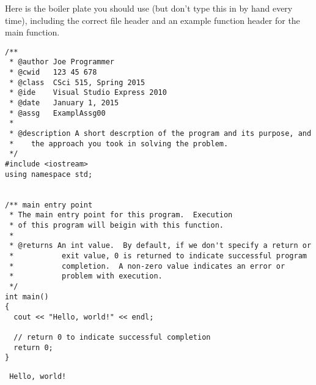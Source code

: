 \documentclass[11pt]{article}
\begin{document}
Here is the boiler plate you should use (but don't type this in by hand every time), including the correct file
header and an example function header for the main function.


\begin{verbatim}
/**
 * @author Joe Programmer
 * @cwid   123 45 678
 * @class  CSci 515, Spring 2015
 * @ide    Visual Studio Express 2010
 * @date   January 1, 2015
 * @assg   ExamplAssg00
 *
 * @description A short descrption of the program and its purpose, and
 *    the approach you took in solving the problem.
 */
#include <iostream>
using namespace std;


/** main entry point
 * The main entry point for this program.  Execution
 * of this program will beigin with this function.
 *
 * @returns An int value.  By default, if we don't specify a return or
 *           exit value, 0 is returned to indicate successful program
 *           completion.  A non-zero value indicates an error or
 *           problem with execution.
 */
int main()
{
  cout << "Hello, world!" << endl;

  // return 0 to indicate successful completion
  return 0;
}
\end{verbatim}

\begin{verbatim}
 Hello, world!
\end{verbatim}
\end{document}
